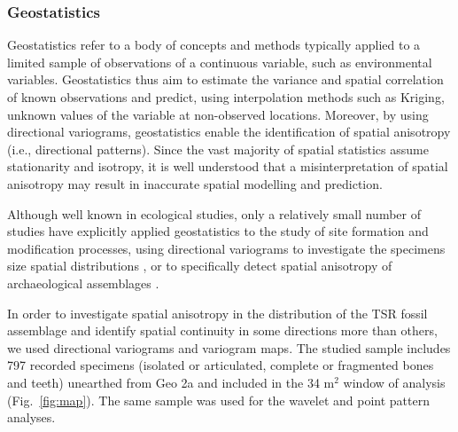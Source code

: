 \documentclass[review,times,authoryear]{elsarticle} %
\begin{document}
\subsubsection{Geostatistics}

Geostatistics refer to a body of concepts and methods typically applied to a limited sample of observations of a continuous variable, such as environmental variables. Geostatistics thus aim to estimate the variance and spatial correlation of known observations and predict, using interpolation methods such as Kriging, unknown values of the variable at non-observed locations. Moreover, by using directional variograms, geostatistics enable the identification of spatial anisotropy (i.e., directional patterns). Since the vast majority of spatial statistics assume stationarity and isotropy, it is well understood that a misinterpretation of spatial anisotropy may result in inaccurate spatial modelling and prediction.

Although well known in ecological studies, only a relatively small number of studies have explicitly applied geostatistics to the study of site formation and modification processes, using directional variograms to investigate the specimens size spatial distributions \citep{Dominguez-Rodrigo2014b,Dominguez-Rodrigo2014c}, or to specifically detect spatial anisotropy of archaeological assemblages \citep{Bevan2009,Markofsky2012}.

In order to investigate spatial anisotropy in the distribution of the TSR fossil assemblage and identify spatial continuity in some directions more than others, we used directional variograms and variogram maps. The studied sample includes 797 recorded specimens (isolated or articulated, complete or fragmented bones and teeth) unearthed from Geo 2a and included in the 34 m$^2$ window of analysis (Fig.~\ref{fig:map}). The same sample was used for the wavelet and point pattern analyses.
\end{document}
